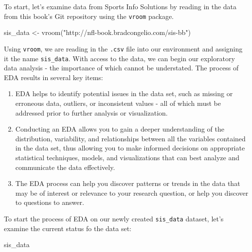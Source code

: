 \documentclass[
  letterpaper,
]{krantz}
\newenvironment{Shaded}{\begin{snugshade}}{\end{snugshade}}
\newcommand{\FunctionTok}[1]{\textcolor[rgb]{0.28,0.35,0.67}{#1}}
\newcommand{\NormalTok}[1]{\textcolor[rgb]{0.00,0.23,0.31}{#1}}
\newcommand{\OtherTok}[1]{\textcolor[rgb]{0.00,0.23,0.31}{#1}}
\newcommand{\StringTok}[1]{\textcolor[rgb]{0.13,0.47,0.30}{#1}}
\providecommand{\tightlist}{%
  \setlength{\itemsep}{0pt}\setlength{\parskip}{0pt}}\usepackage{longtable,booktabs,array}
\begin{document}
To start, let's examine data from Sports Info Solutions by reading in
the data from this book's Git repository using the \texttt{vroom}
package.

\begin{Shaded}
\begin{Highlighting}[]
\NormalTok{sis\_data }\OtherTok{\textless{}{-}} \FunctionTok{vroom}\NormalTok{(}\StringTok{"http://nfl{-}book.bradcongelio.com/sis{-}bb"}\NormalTok{)}
\end{Highlighting}
\end{Shaded}

Using \texttt{vroom}, we are reading in the \texttt{.csv} file into our
environment and assigning it the name \texttt{sis\_data}. With access to
the data, we can begin our exploratory data analysis - the importance of
which cannot be understated. The process of EDA results in several key
items:

\begin{enumerate}
\def\labelenumi{\arabic{enumi}.}
\tightlist
\item
  EDA helps to identify potential issues in the data set, such as
  missing or erroneous data, outliers, or inconsistent values - all of
  which must be addressed prior to further analysis or visualization.
\item
  Conducting an EDA allows you to gain a deeper understanding of the
  distribution, variability, and relationships between all the variables
  contained in the data set, thus allowing you to make informed
  decisions on appropriate statistical techniques, models, and
  visualizations that can best analyze and communicate the data
  effectively.
\item
  The EDA process can help you discover patterns or trends in the data
  that may be of interest or relevance to your research question, or
  help you discover to questions to answer.
\end{enumerate}

To start the process of EDA on our newly created \texttt{sis\_data}
dataset, let's examine the current status fo the data set:

\begin{Shaded}
\begin{Highlighting}[]
\NormalTok{sis\_data}
\end{Highlighting}
\end{Shaded}
\end{document}

